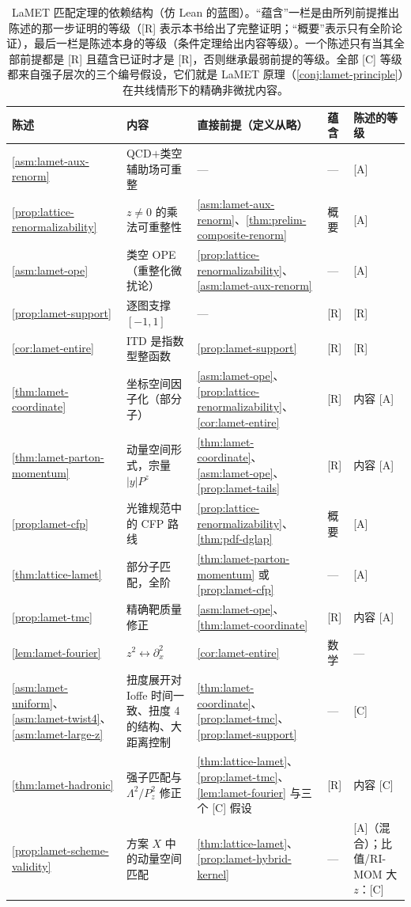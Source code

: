 \begin{table}[htbp]
\centering
\footnotesize
\renewcommand{\arraystretch}{1.12}
\begin{tabularx}{\textwidth}{@{}p{2.25cm}Xp{3.6cm}p{0.95cm}p{1.75cm}@{}}
\toprule
陈述 & 内容 & 直接前提（定义从略） & 蕴含 & 陈述的等级 \\
\midrule
\cref{asm:lamet-aux-renorm} & QCD$+$类空辅助场可重整 & — & — & [A] \\
\cref{prop:lattice-renormalizability} & $z\neq0$ 的乘法可重整性 & \cref{asm:lamet-aux-renorm}、\cref{thm:prelim-composite-renorm} & 概要 & [A] \\
\cref{asm:lamet-ope} & 类空 OPE（重整化微扰论） & \cref{prop:lattice-renormalizability}、\cref{asm:lamet-aux-renorm} & — & [A] \\
\cref{prop:lamet-support} & 逐图支撑 $[-1,1]$ & — & [R] & [R] \\
\cref{cor:lamet-entire} & ITD 是指数型整函数 & \cref{prop:lamet-support} & [R] & [R] \\
\cref{thm:lamet-coordinate} & 坐标空间因子化（部分子） & \cref{asm:lamet-ope}、\cref{prop:lattice-renormalizability}、\cref{cor:lamet-entire} & [R] & 内容 [A] \\
\cref{thm:lamet-parton-momentum} & 动量空间形式，宗量 $|y|P^z$ & \cref{thm:lamet-coordinate}、\cref{asm:lamet-ope}、\cref{prop:lamet-tails} & [R] & 内容 [A] \\
\cref{prop:lamet-cfp} & 光锥规范中的 CFP 路线 & \cref{prop:lattice-renormalizability}、\cref{thm:pdf-dglap} & 概要 & [A] \\
\cref{thm:lattice-lamet} & 部分子匹配，全阶 & \cref{thm:lamet-parton-momentum} 或 \cref{prop:lamet-cfp} & — & [A] \\
\cref{prop:lamet-tmc} & 精确靶质量修正 & \cref{asm:lamet-ope}、\cref{thm:lamet-coordinate} & [R] & 内容 [A] \\
\cref{lem:lamet-fourier} & $z^2\leftrightarrow\partial_x^2$ & \cref{cor:lamet-entire} & 数学 & — \\
\cref{asm:lamet-uniform}、\cref{asm:lamet-twist4}、\cref{asm:lamet-large-z} & 扭度展开对 Ioffe 时间一致、扭度 4 的结构、大距离控制 & \cref{thm:lamet-coordinate}、\cref{prop:lamet-tmc}、\cref{prop:lamet-support} & — & [C] \\
\cref{thm:lamet-hadronic} & 强子匹配与 $\Lambda^2/P_z^2$ 修正 & \cref{thm:lattice-lamet}、\cref{prop:lamet-tmc}、\cref{lem:lamet-fourier} 与三个 [C] 假设 & [R] & 内容 [C] \\
\cref{prop:lamet-scheme-validity} & 方案 $X$ 中的动量空间匹配 & \cref{thm:lattice-lamet}、\cref{prop:lamet-hybrid-kernel} & — & [A]（混合）；比值/RI-MOM 大 $z$：[C] \\
\bottomrule
\end{tabularx}
\caption{LaMET 匹配定理的依赖结构（仿 Lean 的蓝图）。“蕴含”一栏是由所列前提推出陈述的那一步证明的等级（[R] 表示本书给出了完整证明；“概要”表示只有全阶论证），最后一栏是陈述本身的等级（条件定理给出内容等级）。一个陈述只有当其全部前提都是 [R] 且蕴含已证时才是 [R]，否则继承最弱前提的等级。全部 [C] 等级都来自强子层次的三个编号假设，它们就是 LaMET 原理（\cref{conj:lamet-principle}）在共线情形下的精确非微扰内容。}
\label{tab:lamet-dependency}
\end{table}

